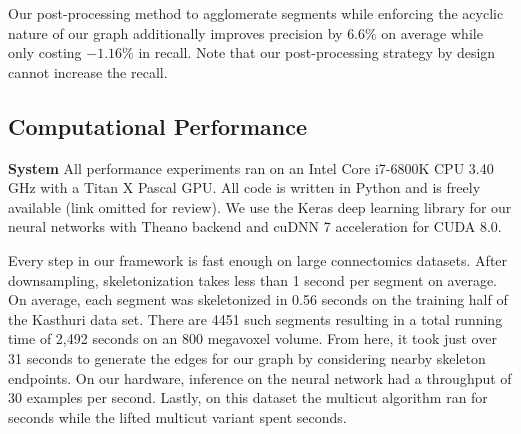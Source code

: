\begin{table}[h]
	\caption{Precision, recall, and accuracy changes between CNN only and CNN paired with graph-optimized reconstructions for the training and three test datasets. The combined method results in better precision and accuracy.}
	\centering
{}
	\label{table:multicut}
\end{table}

Our post-processing method to agglomerate segments while enforcing the acyclic nature of our graph additionally improves precision by $6.6\%$ on average while only costing $-1.16\%$ in recall. 
Note that our post-processing strategy by design cannot increase the recall. 

\subsection{Computational Performance}
\noindent\textbf{System}
All performance experiments ran on an Intel Core i7-6800K CPU 3.40 GHz with a Titan X Pascal GPU. All code is written in Python and is freely available (link omitted for review). We use the Keras deep learning library for our neural networks with Theano backend and cuDNN 7 acceleration for CUDA 8.0.

Every step in our framework is fast enough on large connectomics datasets. 
After downsampling, skeletonization takes less than 1 second per segment on average. 
On average, each segment was skeletonized in 0.56 seconds on the training half of the Kasthuri data set. 
There are 4451 such segments resulting in a total running time of 2,492 seconds on an 800 megavoxel volume. 
From here, it took just over 31 seconds to generate the edges for our graph by considering nearby skeleton endpoints.
On our hardware, inference on the neural network had a throughput of 30 examples per second. 
Lastly, on this dataset the multicut algorithm ran for  seconds while the lifted multicut variant spent  seconds.
